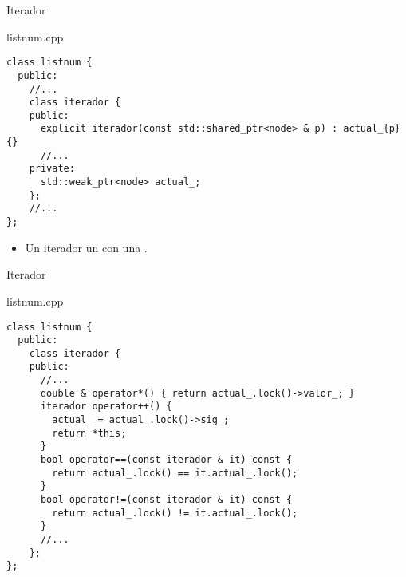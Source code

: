 \begin{frame}[t,fragile]{Iterador}
\begin{block}{listnum.cpp}
\begin{lstlisting}
class listnum {
  public:
    //...
    class iterador {
    public:
      explicit iterador(const std::shared_ptr<node> & p) : actual_{p} {}
      //...
    private:
      std::weak_ptr<node> actual_;
    };
    //...
};
\end{lstlisting}
\end{block}
\begin{itemize}
  \item Un iterador  un  con una 
        .
\end{itemize}
\end{frame}


\begin{frame}[t,fragile]{Iterador}
\begin{block}{listnum.cpp}
\begin{lstlisting}
class listnum {
  public:
    class iterador {
    public:
      //...
      double & operator*() { return actual_.lock()->valor_; }
      iterador operator++() {
        actual_ = actual_.lock()->sig_;
        return *this;
      }
      bool operator==(const iterador & it) const {
        return actual_.lock() == it.actual_.lock();
      }
      bool operator!=(const iterador & it) const {
        return actual_.lock() != it.actual_.lock();
      }
      //...
    };
};
\end{lstlisting}
\end{block}
\end{frame}

